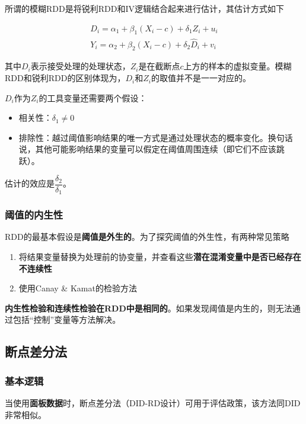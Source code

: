\documentclass[11pt,a4paper]{ctexart}
\newcommand{\ba}{\begin{aligned}}
\newcommand{\ea}{\end{aligned}}
\begin{document}
所谓的模糊RDD是将锐利RDD和IV逻辑结合起来进行估计，其估计方式如下

\[\ba
D_i=\alpha_1+\beta_1 (X_i-c)+\delta_1 Z_i+u_i\\
Y_i=\alpha_2+\beta_2(X_i-c)+\delta_2 \hat D_i+v_i
\ea\]

其中\(D_i\)表示接受处理的处理状态，\(Z_i\)是在截断点\(c\)上方的样本的虚拟变量。模糊RDD和锐利RDD的区别体现为，\(D_i\)和\(Z_i\)的取值并不是一一对应的。

\(D_i\)作为\(Z_i\)的工具变量还需要两个假设：

\begin{itemize}
\item
  相关性：\(\delta_1\ne 0\)
\item
  排除性：越过阈值影响结果的唯一方式是通过处理状态的概率变化。换句话说，其他可能影响结果的变量可以假定在阈值周围连续（即它们不应该跳跃）。
\end{itemize}

估计的效应是\(\dfrac{\delta_2}{\delta_1}\)。

\subsubsection{阈值的内生性}

RDD的最基本假设是\textbf{阈值是外生的}。为了探究阈值的外生性，有两种常见策略

\begin{enumerate}
\def\labelenumi{\arabic{enumi}.}
\item
  将结果变量替换为处理前的协变量，并查看这些\textbf{潜在混淆变量中是否已经存在不连续性}
\item
  使用Canay \& Kamat的检验方法
\end{enumerate}

\textbf{内生性检验和连续性检验在RDD中是相同的}。如果发现阈值是内生的，则无法通过包括``控制''变量等方法解决。

\subsection{断点差分法}

\subsubsection{基本逻辑}

当使用\textbf{面板数据}时，断点差分法（DID-RD设计）可用于评估政策，该方法同DID非常相似。
\end{document}
